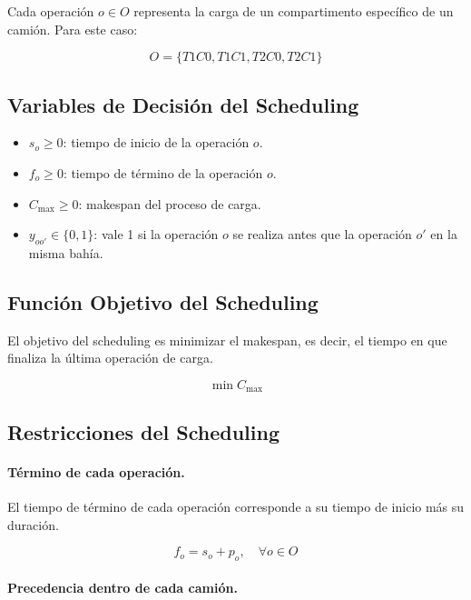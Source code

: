 Cada operación $o \in O$ representa la carga de un compartimento específico de un camión. Para este caso:

\begin{equation*}
O = \{T1C0, T1C1, T2C0, T2C1\}
\end{equation*}

\subsection{Variables de Decisión del Scheduling}

\begin{itemize}
    \item $s_o \geq 0$: tiempo de inicio de la operación $o$.
    \item $f_o \geq 0$: tiempo de término de la operación $o$.
    \item $C_{\max} \geq 0$: makespan del proceso de carga.
    \item $y_{oo'} \in \{0,1\}$: vale 1 si la operación $o$ se realiza antes que la operación $o'$ en la misma bahía.
\end{itemize}

\subsection{Función Objetivo del Scheduling}

El objetivo del scheduling es minimizar el makespan, es decir, el tiempo en que finaliza la última operación de carga.

\begin{equation}
    \min C_{\max}
\end{equation}

\subsection{Restricciones del Scheduling}

\paragraph{Término de cada operación.}

El tiempo de término de cada operación corresponde a su tiempo de inicio más su duración.

\begin{equation}
    f_o = s_o + p_o,
    \quad \forall o \in O
\end{equation}

\paragraph{Precedencia dentro de cada camión.}

